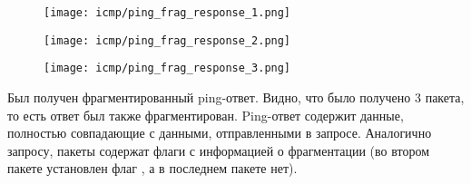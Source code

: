 \begin{figure}[H]
	\centering
	\texttt{[image: icmp/ping\_frag\_response\_1.png]}
\end{figure}
\vspace{-1.8em}
\begin{figure}[H]
	\centering
	\texttt{[image: icmp/ping\_frag\_response\_2.png]}
\end{figure}
\vspace{-1.8em}
\begin{figure}[H]
	\centering
	\texttt{[image: icmp/ping\_frag\_response\_3.png]}
\end{figure}

Был получен фрагментированный ping-ответ. Видно, что было получено 3 пакета, то есть ответ был также фрагментирован. Ping-ответ содержит данные, полностью совпадающие с данными, отправленными в запросе. Аналогично запросу, пакеты содержат флаги с информацией о фрагментации (во втором пакете установлен флаг , а в последнем пакете нет).


